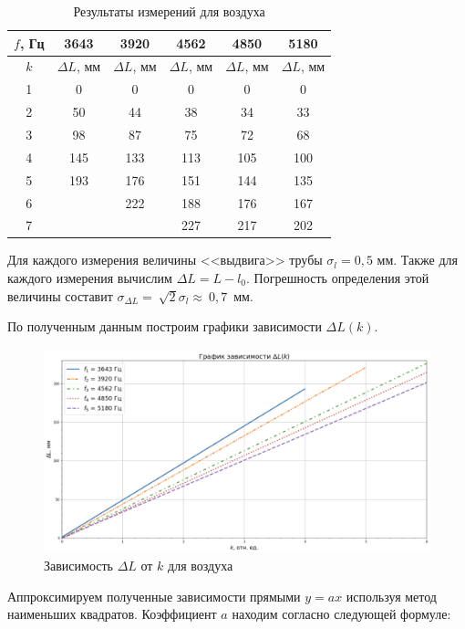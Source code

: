 \documentclass[a4paper,12pt]{article}
\theoremstyle{definition}
\begin{document}
	\begin{table}[H]
		\centering
		\begin{tabular}{|c|c|c|c|c|c|}
			\hline
			$ f $, Гц & \textbf{3643}  &\textbf{3920}  & \textbf{4562}& \textbf{4850}& \textbf{5180} \\ \hline
			$ k $ &  $ \Delta L $, мм & $\Delta L $, мм &$\Delta L $, мм & $\Delta L $, мм &  $\Delta L $, мм \\ \hline
			1&0&0&0&0&0\\ \hline
			2&50&44&38&34&33\\\hline
			3&98&87&75&72&68\\\hline
			4&145&133&113&105&100\\\hline
			5&193&176&151&144&135\\\hline
			6&&222&188&176&167\\\hline
			7&&&227&217&202\\\hline
			
		\end{tabular}
		\caption{Результаты измерений для воздуха}
		\label{tab:oxy}
	\end{table}
	
	Для каждого измерения величины <<выдвига>> трубы $ \sigma_l = 0,5 $ мм. Также для каждого измерения вычислим $ \Delta L = L - l_0 $. Погрешность определения этой величины составит $ \sigma_{\Delta L}=~\sqrt{2}\sigma_l \approx~0,7 $~мм.
	
	По полученным данным построим графики зависимости $ \Delta L(k) $.
	
	\begin{figure}[h!]
		\centering
		\includegraphics[scale=0.542]{graph1}
		\caption{Зависимость $ \Delta L $ от $ k $ для воздуха}
		\label{graph1}
	\end{figure}
	
	Аппроксимируем полученные зависимости прямыми $ y=ax $ используя метод наименьших квадратов. Коэффициент $ a $ находим согласно следующей формуле:
	
\end{document}
